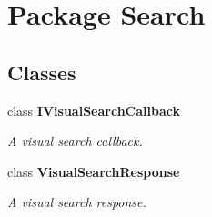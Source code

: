 \section{Package Search}
\label{namespace_search}
\subsection*{Classes}
\begin{DoxyCompactItemize}
\item 
class {\bf I\-Visual\-Search\-Callback}
\begin{DoxyCompactList}\small\item\em A visual search callback. \end{DoxyCompactList}\item 
class {\bf Visual\-Search\-Response}
\begin{DoxyCompactList}\small\item\em A visual search response. \end{DoxyCompactList}\end{DoxyCompactItemize}
